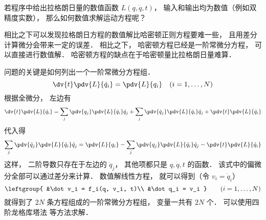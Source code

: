 
\begin{issues}
\issueDraft
\end{issues}


若程序中给出拉格朗日量的数值函数 $L(q, \dot q, t)$， 输入和输出均为数值（例如双精度实数）， 那么如何数值求解运动方程呢？

相比之下可以发现拉格朗日方程的数值解比哈密顿正则方程要难一些， 且用差分计算微分会带来一定的误差． 相比之下， 哈密顿方程已经是一阶常微分方程， 可以直接进行数值解． 哈密顿方程的缺点在于哈密顿量比拉格朗日量难算．

问题的关键是如何列出一个一阶常微分方程组．
\begin{equation}
\dv{t} \pdv{L}{\dot q_i} = \pdv{L}{q_i}
\quad (i=1,\dots,N)
\end{equation}
根据全微分， 左边有
\begin{equation}
\dv{t} \pdv{L}{\dot q_i} = \sum_j\pdv{q_j}\pdv{L}{\dot q_i}\dot q_j + \sum_j\pdv{\dot q_j}\pdv{L}{\dot q_i}\ddot q_j + \pdv{t}\pdv{L}{\dot q_i}
\end{equation}
代入得
\begin{equation}
\sum_j\pdv{\dot q_j}\pdv{L}{\dot q_i}\ddot q_j = \pdv{L}{q_i} - \sum_j\pdv{q_j}\pdv{L}{\dot q_i}\dot q_j - \pdv{t}\pdv{L}{\dot q_i}
\end{equation}
这样， 二阶导数只存在于左边的 $\ddot q_j$， 其他项都只是 $q,\dot q, t$ 的函数． 该式中的偏微分全部可以通过差分来计算． 数值解线性方程， 就可以得到（令 $v_i = \dot q_i$）
\begin{equation}
\leftgroup{
&\dot v_i = f_i(q, v_i, t)\\
&\dot q_i = v_i
}\qquad (i = 1,\dots,N)
\end{equation}
就得到了 $2N$ 条方程组成的一阶常微分方程组， 变量一共有 $2N$ 个． 可以使用四阶龙格库塔法 等方法求解．
